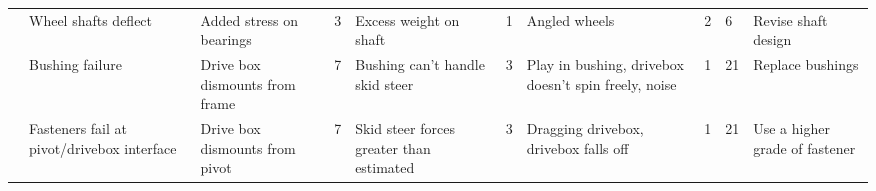{\begin{landscape}
\begin{minipage}{\linewidth}
\begin{tabular}{| p{1cm}|p{3cm}p{3.5cm}p{0.5cm}p{3cm}p{0.5cm}p{3.5cm}p{0.5cm}p{0.5cm}p{3cm} |}
 & Wheel shafts deflect & Added stress on bearings & 3 & Excess weight on shaft & 1 & Angled wheels & 2 & 6 & Revise shaft design \\
 & Bushing failure & Drive box dismounts from frame & 7 & Bushing can't handle skid steer & 3 & Play in bushing, drivebox doesn't spin freely, noise & 1 & 21 & Replace bushings \\
 & Fasteners fail at pivot/drivebox interface& Drive box dismounts from pivot & 7 & Skid steer forces greater than estimated & 3 & Dragging drivebox, drivebox falls off & 1 & 21 & Use a higher grade of fastener \\ \hline
 \end{tabular}
 \label{tab:dfmea}
 \end{minipage}
 \end{landscape}
}